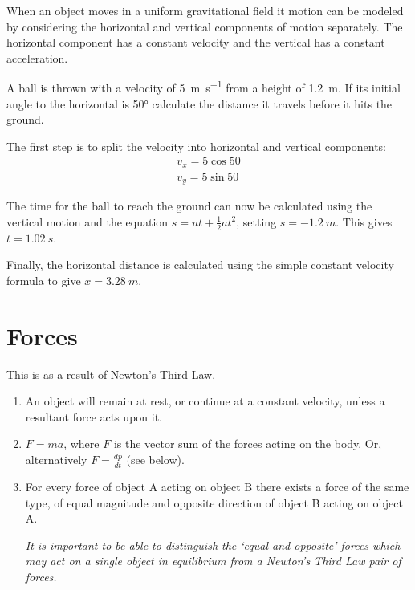 \documentclass[main.tex]{subfiles}
\begin{document}
When an object moves in a uniform gravitational field it motion can be modeled by considering the horizontal and vertical components of motion separately. The horizontal component has a constant velocity and the vertical has a constant acceleration.

\begin{example}
A ball is thrown with a velocity of \SI{5}{m.s^{-1}} from a height of \SI{1.2}{m}. If its initial angle to the horizontal is \ang{50} calculate the distance it travels before it hits the ground.
\answer

The first step is to split the velocity into horizontal and vertical components:
	\begin{align*}
		v_x = 5\cos{50}\\
		v_y = 5\sin{50}
	\end{align*}

	The time for the ball to reach the ground can now be calculated using the vertical motion and the equation $s=ut+\frac{1}{2}at^2$, setting $s = \SI{-1.2}{m}$. This gives $t=\SI{1.02}{s}$.

	Finally, the horizontal distance is calculated using the simple constant velocity formula to give $x=\SI{3.28}{m}$.
\end{example}

\section{Forces}


This is as a result of Newton's Third Law.

\begin{enumerate}
	\item An object will remain at rest, or continue at a constant velocity, unless a resultant force acts upon it.
	\item $F=ma$, where $F$ is the vector sum of the forces acting on the body. Or, alternatively $F=\frac{dp}{dt}$ (see below).
	\item For every force of object A acting on object B there exists a force of the same type, of equal magnitude and opposite direction of object B acting on object A.

	\emph{It is important to be able to distinguish the `equal and opposite' forces which may act on a single object in equilibrium from a Newton's Third Law pair of forces.}
\end{enumerate}
\end{document}
